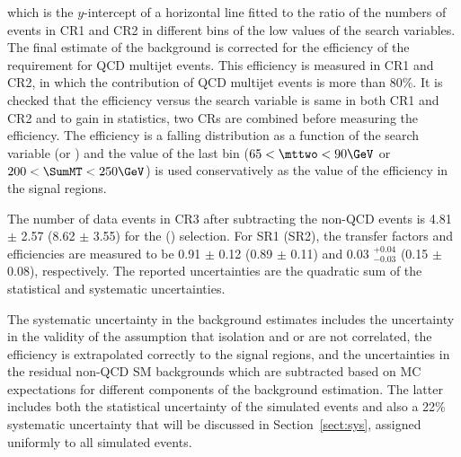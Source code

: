 which is the $y$-intercept of a horizontal line fitted to the ratio of the numbers of events in CR1 and CR2 in different bins of the 
low values of the search variables.
The final estimate of the background is corrected for the efficiency of 
the \deltaphi requirement for QCD multijet events. This efficiency is measured in CR1 and CR2, 
in which the contribution of QCD multijet events is more than $80\%$. It is checked that the efficiency versus the search variable is 
same in both CR1 and CR2 and to gain in statistics, two CRs are combined before measuring the efficiency. 
The efficiency is a falling distribution as a function of 
the search variable (\mttwo or \SumMT) and the value of the last bin ($65<\mttwo<90\GeV$ or $200<\SumMT<250\GeV$) 
is used conservatively as the value of the efficiency in the signal regions.

The number of data events in CR3 after subtracting the non-QCD events is 4.81 $\pm$ 2.57 (8.62 $\pm$ 3.55) for the \binone (\bintwo) selection.
For SR1 (SR2), the transfer factors and  \deltaphi efficiencies are measured to be 0.91 $\pm$ 0.12 (0.89 $\pm$ 0.11) and 0.03 $^{+0.04} _{-0.03}$ (0.15 $\pm$ 0.08), 
respectively.
The reported uncertainties are the quadratic sum of the statistical and systematic uncertainties.


The systematic uncertainty in the background estimates includes the uncertainty in the validity of the assumption that isolation 
and \mttwo or \SumMT are not correlated, the \deltaphi efficiency is extrapolated correctly to the signal regions, and the uncertainties in the residual 
non-QCD SM backgrounds which  are subtracted based on MC expectations for different components of the background estimation. 
The latter includes both the statistical uncertainty of the simulated 
events and also a 22\% systematic uncertainty that will be discussed in Section~\ref{sect:sys}, 
assigned uniformly to all simulated events.

